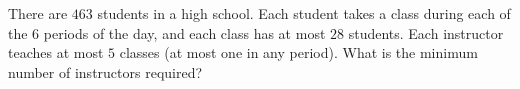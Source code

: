There are $463$ students in a high school. Each student takes a class during each of the $6$ periods of the day, and each class has at most $28$ students. Each instructor teaches at most $5$ classes (at most one in any period). What is the minimum number of instructors required?

